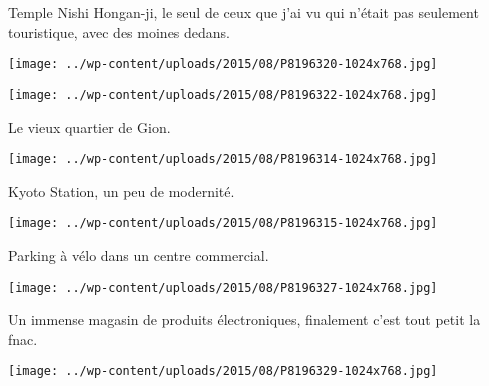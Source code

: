  Temple Nishi Hongan-ji, le seul de ceux que j'ai vu qui n'était pas seulement touristique, avec des moines dedans.
\begin{center} \texttt{[image: ../wp-content/uploads/2015/08/P8196320-1024x768.jpg]} \end{center}
\begin{center} \texttt{[image: ../wp-content/uploads/2015/08/P8196322-1024x768.jpg]} \end{center}

 Le vieux quartier de Gion.
\begin{center} \texttt{[image: ../wp-content/uploads/2015/08/P8196314-1024x768.jpg]} \end{center}

\pagebreak
 Kyoto Station, un peu de modernité.
\begin{center} \texttt{[image: ../wp-content/uploads/2015/08/P8196315-1024x768.jpg]} \end{center}

 Parking à vélo dans un centre commercial.
\begin{center} \texttt{[image: ../wp-content/uploads/2015/08/P8196327-1024x768.jpg]} \end{center}

\pagebreak
 Un immense magasin de produits électroniques, finalement c'est tout petit la fnac. 
\begin{center} \texttt{[image: ../wp-content/uploads/2015/08/P8196329-1024x768.jpg]} \end{center}